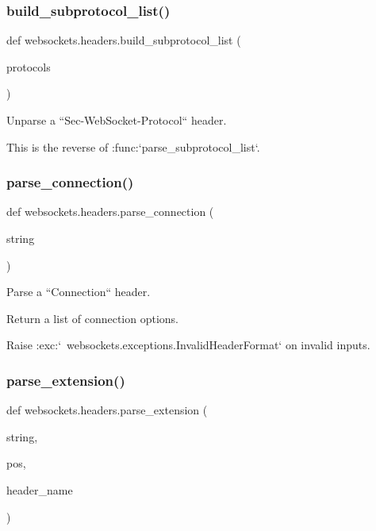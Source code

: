 \subsubsection{\texorpdfstring{build\+\_\+subprotocol\+\_\+list()}{build\_subprotocol\_list()}}
{\footnotesize\ttfamily def websockets.\+headers.\+build\+\_\+subprotocol\+\_\+list (\begin{DoxyParamCaption}\item[{}]{protocols }\end{DoxyParamCaption})}

\begin{DoxyVerb}Unparse a ``Sec-WebSocket-Protocol`` header.

This is the reverse of :func:`parse_subprotocol_list`.\end{DoxyVerb}
 \mbox{\label{namespacewebsockets_1_1headers_a74bd8bbf96afdae6f04582aeb6949618}} 
\subsubsection{\texorpdfstring{parse\+\_\+connection()}{parse\_connection()}}
{\footnotesize\ttfamily def websockets.\+headers.\+parse\+\_\+connection (\begin{DoxyParamCaption}\item[{}]{string }\end{DoxyParamCaption})}

\begin{DoxyVerb}Parse a ``Connection`` header.

Return a list of connection options.

Raise :exc:`~websockets.exceptions.InvalidHeaderFormat` on invalid inputs.\end{DoxyVerb}
 \mbox{\label{namespacewebsockets_1_1headers_a4b02ba1a387434731b7cbfed858886f1}} 
\subsubsection{\texorpdfstring{parse\+\_\+extension()}{parse\_extension()}}
{\footnotesize\ttfamily def websockets.\+headers.\+parse\+\_\+extension (\begin{DoxyParamCaption}\item[{}]{string,  }\item[{}]{pos,  }\item[{}]{header\+\_\+name }\end{DoxyParamCaption})}

